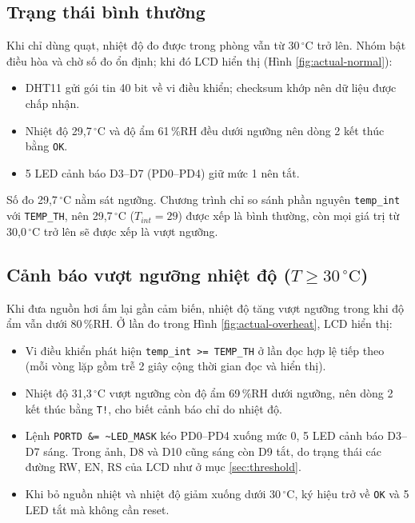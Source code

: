 \subsection{Trạng thái bình thường}
Khi chỉ dùng quạt, nhiệt độ đo được trong phòng vẫn từ 30\,$^\circ$C trở lên. Nhóm bật điều hòa và chờ số đo ổn định; khi đó LCD hiển thị (Hình \ref{fig:actual-normal}):
\begin{itemize}[leftmargin=1.2cm]
    \item DHT11 gửi gói tin 40 bit về vi điều khiển; checksum khớp nên dữ liệu được chấp nhận.
    \item Nhiệt độ 29,7\,$^\circ$C và độ ẩm 61\,\%RH đều dưới ngưỡng nên dòng 2 kết thúc bằng \texttt{OK}.
    \item 5 LED cảnh báo D3--D7 (PD0--PD4) giữ mức 1 nên tắt.
\end{itemize}
Số đo 29,7\,$^\circ$C nằm sát ngưỡng. Chương trình chỉ so sánh phần nguyên \texttt{temp\_int} với \texttt{TEMP\_TH}, nên 29,7\,$^\circ$C ($T_{int} = 29$) được xếp là bình thường, còn mọi giá trị từ 30,0\,$^\circ$C trở lên sẽ được xếp là vượt ngưỡng.

\subsection{\texorpdfstring{Cảnh báo vượt ngưỡng nhiệt độ ($T \ge 30\,^\circ\text{C}$)}{Cảnh báo vượt ngưỡng nhiệt độ (T ≥ 30 °C)}}
Khi đưa nguồn hơi ấm lại gần cảm biến, nhiệt độ tăng vượt ngưỡng trong khi độ ẩm vẫn dưới 80\,\%RH. Ở lần đo trong Hình \ref{fig:actual-overheat}, LCD hiển thị:
\begin{itemize}[leftmargin=1.2cm]
    \item Vi điều khiển phát hiện \texttt{temp\_int >= TEMP\_TH} ở lần đọc hợp lệ tiếp theo (mỗi vòng lặp gồm trễ 2 giây cộng thời gian đọc và hiển thị).
    \item Nhiệt độ 31,3\,$^\circ$C vượt ngưỡng còn độ ẩm 69\,\%RH dưới ngưỡng, nên dòng 2 kết thúc bằng \texttt{T!}, cho biết cảnh báo chỉ do nhiệt độ.
    \item Lệnh \texttt{PORTD \&= \textasciitilde LED\_MASK} kéo PD0--PD4 xuống mức 0, 5 LED cảnh báo D3--D7 sáng. Trong ảnh, D8 và D10 cũng sáng còn D9 tắt, do trạng thái các đường RW, EN, RS của LCD như ở mục \ref{sec:threshold}.
    \item Khi bỏ nguồn nhiệt và nhiệt độ giảm xuống dưới 30\,$^\circ$C, ký hiệu trở về \texttt{OK} và 5 LED tắt mà không cần reset.
\end{itemize}

